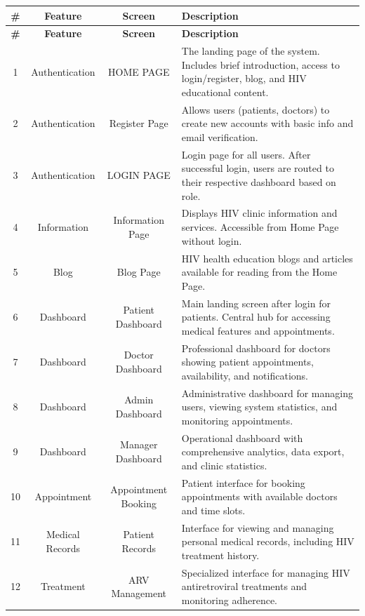 \documentclass[12pt,a4paper]{article}
\begin{document}
\renewcommand{\arraystretch}{1.4}
\begin{longtable}{|c|c|c|p{8.5cm}|}
\hline
\textbf{\#} & \textbf{Feature} & \textbf{Screen} & \textbf{Description} \\
\hline
\endfirsthead

\hline
\textbf{\#} & \textbf{Feature} & \textbf{Screen} & \textbf{Description} \\
\hline
\endhead

1 & Authentication & HOME PAGE & The landing page of the system. Includes brief introduction, access to login/register, blog, and HIV educational content. \\
\hline
2 & Authentication & Register Page & Allows users (patients, doctors) to create new accounts with basic info and email verification. \\
\hline
3 & Authentication & LOGIN PAGE & Login page for all users. After successful login, users are routed to their respective dashboard based on role. \\
\hline
4 & Information & Information Page & Displays HIV clinic information and services. Accessible from Home Page without login. \\
\hline
5 & Blog & Blog Page & HIV health education blogs and articles available for reading from the Home Page. \\
\hline
6 & Dashboard & Patient Dashboard & Main landing screen after login for patients. Central hub for accessing medical features and appointments. \\
\hline
7 & Dashboard & Doctor Dashboard & Professional dashboard for doctors showing patient appointments, availability, and notifications. \\
\hline
8 & Dashboard & Admin Dashboard & Administrative dashboard for managing users, viewing system statistics, and monitoring appointments. \\
\hline
9 & Dashboard & Manager Dashboard & Operational dashboard with comprehensive analytics, data export, and clinic statistics. \\
\hline
10 & Appointment & Appointment Booking & Patient interface for booking appointments with available doctors and time slots. \\
\hline
11 & Medical Records & Patient Records & Interface for viewing and managing personal medical records, including HIV treatment history. \\
\hline
12 & Treatment & ARV Management & Specialized interface for managing HIV antiretroviral treatments and monitoring adherence. \\
\hline
\end{longtable}
\end{document}
